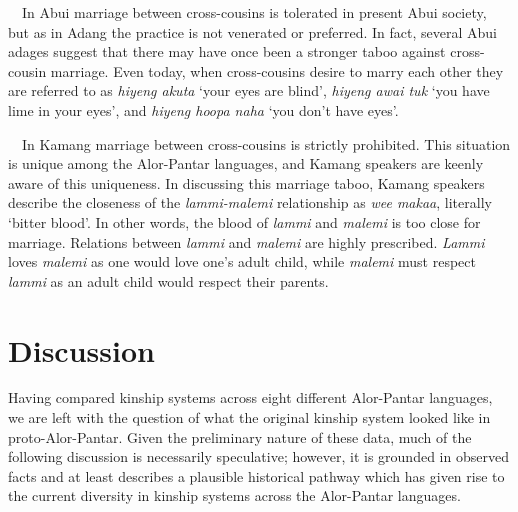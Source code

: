 \ \ In Abui marriage between cross-cousins is tolerated in present Abui society, but as in Adang the practice is not venerated or preferred. In fact, several Abui adages suggest that there may have once been a stronger taboo against cross-cousin marriage. Even today, when cross-cousins desire to marry each other they are referred to as \textit{hiyeng akuta }{\textquoteleft}your eyes are blind{\textquoteright}, \textit{hiyeng awai tuk }{\textquoteleft}you have lime in your eyes{\textquoteright}, and \textit{hiyeng hoopa naha} {\textquoteleft}you don{\textquoteright}t have eyes{\textquoteright}.

\ \ In Kamang marriage between cross-cousins is strictly prohibited. This situation is unique among the Alor-Pantar languages, and Kamang speakers are keenly aware of this uniqueness. In discussing this marriage taboo, Kamang speakers describe the closeness of the \textit{lammi-malemi }relationship as \textit{wee makaa}, literally {\textquoteleft}bitter blood{\textquoteright}. In other words, the blood of \textit{lammi }and \textit{malemi }is too close for marriage. Relations between \textit{lammi }and \textit{malemi }are highly prescribed. \textit{Lammi }loves \textit{malemi }as one would love one{\textquoteright}s adult child, while \textit{malemi }must respect \textit{lammi }as an adult child would respect their parents.

\section[Discussion]{Discussion}
\hypertarget{RefHeading78043871885726}{}Having compared kinship systems across eight different Alor-Pantar languages, we are left with the question of what the original kinship system looked like in proto-Alor-Pantar. Given the preliminary nature of these data, much of the following discussion is necessarily speculative; however, it is grounded in observed facts and at least describes a plausible historical pathway which has given rise to the current diversity in kinship systems across the Alor-Pantar languages.

